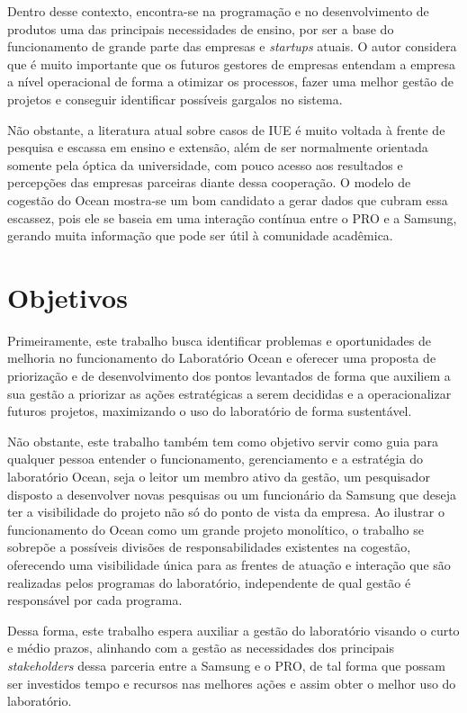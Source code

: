 Dentro desse contexto, encontra-se na programação e no desenvolvimento de produtos uma das principais necessidades de ensino, por ser a base do funcionamento de grande parte das empresas e \textit{startups} atuais. O autor considera que é muito importante que os futuros gestores de empresas entendam a empresa a nível operacional de forma a otimizar os processos, fazer uma melhor gestão de projetos e conseguir identificar possíveis gargalos no sistema.

Não obstante, a literatura atual sobre casos de IUE é muito voltada à frente de pesquisa e escassa em ensino e extensão, além de ser normalmente orientada somente pela óptica da universidade, com pouco acesso aos resultados e percepções das empresas parceiras diante dessa cooperação. O modelo de cogestão do Ocean mostra-se um bom candidato a gerar dados que cubram essa escassez, pois ele se baseia em uma interação contínua entre o PRO e a Samsung, gerando muita informação que pode ser útil à comunidade acadêmica. 

\section[Objetivos]{Objetivos}
\label{chap:objetivos}

Primeiramente, este trabalho busca identificar problemas e oportunidades de melhoria no funcionamento do Laboratório Ocean e oferecer uma proposta de priorização e de desenvolvimento dos pontos levantados de forma que auxiliem a sua gestão a priorizar as ações estratégicas a serem decididas e a operacionalizar futuros projetos, maximizando o uso do laboratório de forma sustentável.

Não obstante, este trabalho também tem como objetivo servir como guia para qualquer pessoa entender o funcionamento, gerenciamento e a estratégia do laboratório Ocean, seja o leitor um membro ativo da gestão, um pesquisador disposto a desenvolver novas pesquisas ou um funcionário da Samsung que deseja ter a visibilidade do projeto não só do ponto de vista da empresa. Ao ilustrar o funcionamento do Ocean como um grande projeto monolítico, o trabalho se sobrepõe a possíveis divisões de responsabilidades existentes na cogestão, oferecendo uma visibilidade única para as frentes de atuação e interação que são realizadas pelos programas do laboratório, independente de qual gestão é responsável por cada programa.

Dessa forma, este trabalho espera auxiliar a gestão do laboratório visando o curto e médio prazos, alinhando com a gestão as necessidades dos principais \textit{stakeholders} dessa parceria entre a Samsung e o PRO, de tal forma que possam ser investidos tempo e recursos nas melhores ações e assim obter o melhor uso do laboratório. 